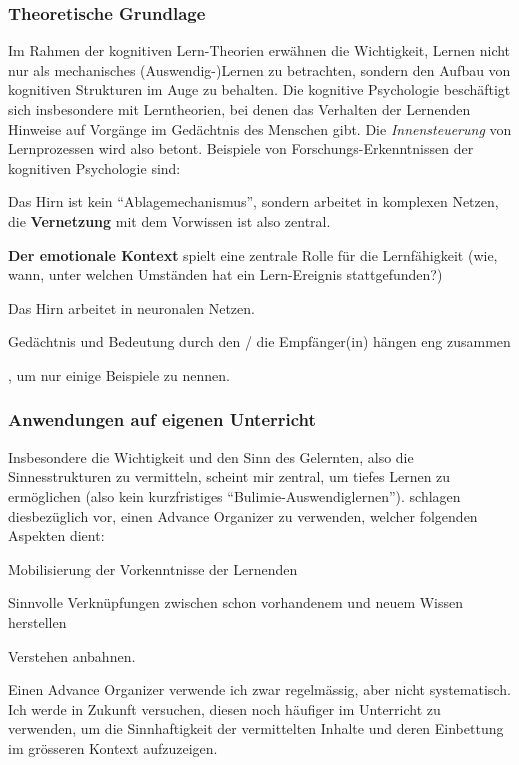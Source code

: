 \begin{myExBox}[title=Sinnvolles Lernen mit \textit{Advance Organizer}]
\subsubsection*{Theoretische Grundlage}
Im Rahmen der kognitiven Lern-Theorien erwähnen  \textcite{alma99117228235505511} die Wichtigkeit, Lernen nicht nur als mechanisches (Auswendig-)Lernen zu betrachten, sondern den Aufbau von kognitiven Strukturen im Auge zu behalten. Die kognitive Psychologie beschäftigt sich insbesondere mit Lerntheorien, bei denen das Verhalten der Lernenden Hinweise auf Vorgänge im Gedächtnis des Menschen gibt. Die \textit{Innensteuerung} von Lernprozessen wird also betont. Beispiele von Forschungs-Erkenntnissen der kognitiven Psychologie sind: \begin{enumerate*}
\item Das Hirn ist kein ``Ablagemechanismus'', sondern arbeitet in komplexen Netzen, die \textbf{Vernetzung} mit dem Vorwissen ist also zentral.
\item \textbf{Der emotionale Kontext} spielt eine zentrale Rolle für die Lernfähigkeit (wie, wann, unter welchen Umständen hat ein Lern-Ereignis stattgefunden?)
\item Das Hirn arbeitet in neuronalen Netzen.
\item Gedächtnis und Bedeutung durch den / die Empfänger(in) hängen eng zusammen
\end{enumerate*}, um nur einige Beispiele zu nennen. 

\subsubsection*{Anwendungen auf eigenen Unterricht} Insbesondere die Wichtigkeit und den Sinn des Gelernten, also die Sinnesstrukturen zu vermitteln, scheint mir zentral, um tiefes Lernen zu ermöglichen (also kein kurzfristiges ``Bulimie-Auswendiglernen''). \textcite{alma99117228235505511} schlagen diesbezüglich vor, einen Advance Organizer zu verwenden, welcher folgenden Aspekten dient:
\begin{enumerate*}
\item Mobilisierung der Vorkenntnisse der Lernenden
\item Sinnvolle Verknüpfungen zwischen schon vorhandenem und neuem Wissen herstellen
\item Verstehen anbahnen.
\end{enumerate*}
Einen Advance Organizer verwende ich zwar regelmässig, aber nicht systematisch. Ich werde in Zukunft versuchen, diesen noch häufiger im Unterricht zu verwenden, um die Sinnhaftigkeit der vermittelten Inhalte und deren Einbettung im grösseren Kontext aufzuzeigen.
\end{myExBox}

